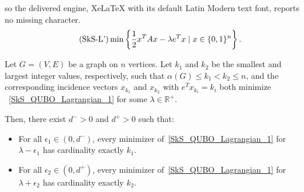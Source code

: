 \documentclass[10pt,a4paper]{amsart}
\begin{document}
so the delivered engine, XeLaTeX with its default Latin Modern text font, reports no missing character.
\begin{align} 
\tag{\mbox{SkS-L'}}
  \min \left\{\frac{1}{2}x^TAx - \lambda e^Tx \mid x \in \{0, 1\}^n \right\}.
  \label{SkS_QUBO_Lagrangian_1} 
\end{align} 

\begin{thm} \label{thm: boundary_ks}
Let $G = (V, E)$ be a graph on $n$ vertices. 
Let $k_1$ and $k_2$ be  the smallest and largest integer values, respectively, such that $\alpha(G) \leq k_1< k_2 \leq n$, and the corresponding incidence vectors $x_{k_1}$ and $x_{k_2}$ with $e^Tx_{k_i}=k_i$ both minimize  ~\eqref{SkS_QUBO_Lagrangian_1} for some $\lambda \in \mathbb{R}^+$.  




Then, there exist $d^- > 0$ and $d^+ > 0$ such that:  
\begin{itemize}
    \item For all $\epsilon_1 \in (0, d^-)$, every minimizer of~\eqref{SkS_QUBO_Lagrangian_1} for $\lambda - \epsilon_1$ has cardinality exactly $k_1$.
    \item For all $\epsilon_2 \in (0, d^+)$, every minimizer of~\eqref{SkS_QUBO_Lagrangian_1} for $\lambda + \epsilon_2$ has cardinality exactly $k_2$.
\end{itemize} 
\end{thm}
\end{document}
